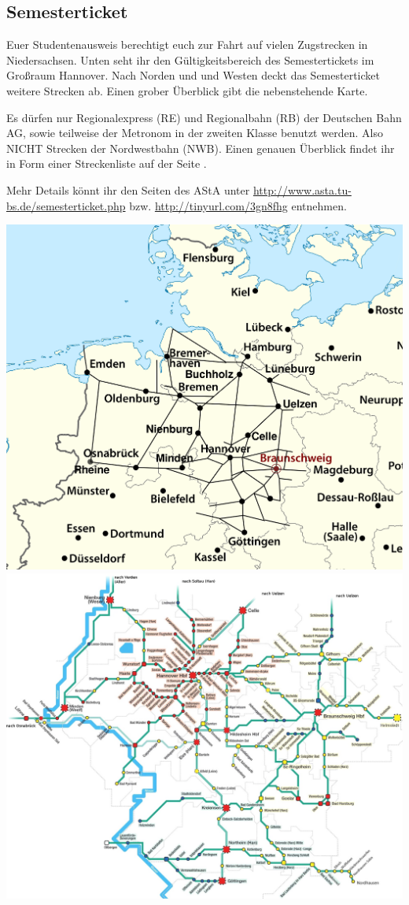 \begin{multicols}{2}
\subsection{Semesterticket}
	Euer Studentenausweis berechtigt euch zur Fahrt auf vielen Zugstrecken in Niedersachsen. Unten seht ihr den Gültigkeitsbereich des Semestertickets im Großraum Hannover. Nach Norden und und Westen deckt das Semesterticket weitere Strecken ab. Einen grober Überblick gibt die nebenstehende Karte. 

	Es dürfen nur Regionalexpress (RE) und Regionalbahn (RB) der Deutschen Bahn AG, sowie teilweise der Metronom in der zweiten Klasse benutzt werden. Also NICHT Strecken der Nordwestbahn (NWB). Einen genauen Überblick findet ihr in Form einer Streckenliste auf der Seite \pageref{streckenliste1}.

	Mehr Details könnt ihr den Seiten des AStA unter \url{http://www.asta.tu-bs.de/semesterticket.php} bzw. \url{http://tinyurl.com/3gn8fhg} entnehmen.
\end{multicols}
\newpage
\includegraphics[width=\columnwidth]{bilder/ticket_deutschland.png}
\newpage
\includegraphics[width=\textwidth]{bilder/ticket_bis_11_Dezember.jpg}
\newpage

